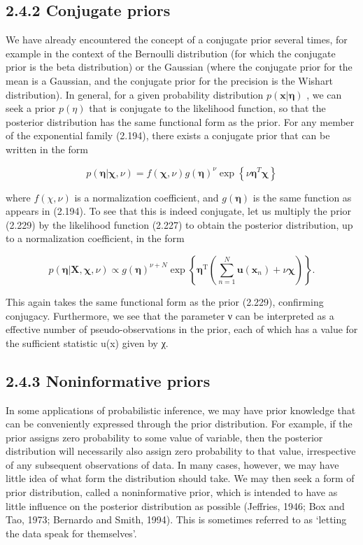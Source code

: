 \documentclass[
  10
]{article}
\begin{document}
\subsection{2.4.2 Conjugate priors}\label{conjugate-priors}

We have already encountered the concept of a conjugate prior several
times, for example in the context of the Bernoulli distribution (for
which the conjugate prior is the beta distribution) or the Gaussian
(where the conjugate prior for the mean is a Gaussian, and the conjugate
prior for the precision is the Wishart distribution). In general, for a
given probability distribution
\(p ( \mathbf { x } | \boldsymbol { \eta } )\) , we can seek a prior
\(p ( \eta )\) that is conjugate to the likelihood function, so that the
posterior distribution has the same functional form as the prior. For
any member of the exponential family (2.194), there exists a conjugate
prior that can be written in the form

\[
p (\boldsymbol {\eta} | \boldsymbol {\chi}, \nu) = f (\boldsymbol {\chi}, \nu) g (\boldsymbol {\eta}) ^ {\nu} \exp \left\{\nu \boldsymbol {\eta} ^ {T} \boldsymbol {\chi} \right\}\tag{2.229}
\]

where \(f ( \chi , \nu )\) is a normalization coefficient, and
\(g ( \pmb { \eta } )\) is the same function as appears in (2.194). To
see that this is indeed conjugate, let us multiply the prior (2.229) by
the likelihood function (2.227) to obtain the posterior distribution, up
to a normalization coefficient, in the form

\[
p (\boldsymbol {\eta} | \mathbf {X}, \boldsymbol {\chi}, \nu) \propto g (\boldsymbol {\eta}) ^ {\nu + N} \exp \left\{\boldsymbol {\eta} ^ {\mathrm{T}} \left(\sum_ {n = 1} ^ {N} \mathbf {u} (\mathbf {x} _ {n}) + \nu \boldsymbol {\chi}\right) \right\}.\tag{2.230}
\]

This again takes the same functional form as the prior (2.229),
confirming conjugacy. Furthermore, we see that the parameter ν can be
interpreted as a effective number of pseudo-observations in the prior,
each of which has a value for the sufficient statistic u(x) given by χ.

\subsection{2.4.3 Noninformative priors}\label{noninformative-priors}

In some applications of probabilistic inference, we may have prior
knowledge that can be conveniently expressed through the prior
distribution. For example, if the prior assigns zero probability to some
value of variable, then the posterior distribution will necessarily also
assign zero probability to that value, irrespective of any subsequent
observations of data. In many cases, however, we may have little idea of
what form the distribution should take. We may then seek a form of prior
distribution, called a noninformative prior, which is intended to have
as little influence on the posterior distribution as possible (Jeffries,
1946; Box and Tao, 1973; Bernardo and Smith, 1994). This is sometimes
referred to as `letting the data speak for themselves'.
\end{document}
